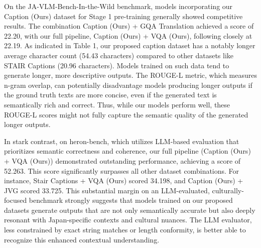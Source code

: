 \documentclass[11pt]{article}
\begin{document}
On the JA-VLM-Bench-In-the-Wild benchmark, models incorporating our Caption (Ours) dataset for Stage 1 pre-training generally showed competitive results. The combination Caption (Ours) + GQA Translation achieved a score of 22.20, with our full pipeline, Caption (Ours) + VQA (Ours), following closely at 22.19. As indicated in Table 1, our proposed caption dataset has a notably longer average character count (54.43 characters) compared to other datasets like STAIR Captions (20.96 characters). Models trained on such data tend to generate longer, more descriptive outputs. The ROUGE-L metric, which measures n-gram overlap, can potentially disadvantage models producing longer outputs if the ground truth texts are more concise, even if the generated text is semantically rich and correct. Thus, while our models perform well, these ROUGE-L scores might not fully capture the semantic quality of the generated longer outputs.

In stark contrast, on heron-bench, which utilizes LLM-based evaluation that prioritizes semantic correctness and coherence, our full pipeline (Caption (Ours) + VQA (Ours)) demonstrated outstanding performance, achieving a score of 52.263. This score significantly surpasses all other dataset combinations. For instance, Stair Captions + VQA (Ours) scored 34.198, and Caption (Ours) + JVG scored 33.725. This substantial margin on an LLM-evaluated, culturally-focused benchmark strongly suggests that models trained on our proposed datasets generate outputs that are not only semantically accurate but also deeply resonant with Japan-specific contexts and cultural nuances. The LLM evaluator, less constrained by exact string matches or length conformity, is better able to recognize this enhanced contextual understanding.
\end{document}
